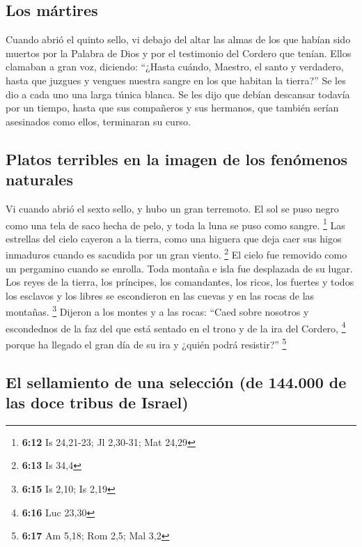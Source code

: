 \hypertarget{los-muxe1rtires}{%
\subsection{Los mártires}\label{los-muxe1rtires}}

 Cuando abrió el quinto sello, vi debajo del altar las
almas de los que habían sido muertos por la Palabra de Dios y por el
testimonio del Cordero que tenían.  Ellos clamaban a gran
voz, diciendo: ``¿Hasta cuándo, Maestro, el santo y verdadero, hasta que
juzgues y vengues nuestra sangre en los que habitan la tierra?''
 Se les dio a cada uno una larga túnica blanca. Se les
dijo que debían descansar todavía por un tiempo, hasta que sus
compañeros y sus hermanos, que también serían asesinados como ellos,
terminaran su curso.

\hypertarget{platos-terribles-en-la-imagen-de-los-fenuxf3menos-naturales}{%
\subsection{Platos terribles en la imagen de los fenómenos
naturales}\label{platos-terribles-en-la-imagen-de-los-fenuxf3menos-naturales}}

 Vi cuando abrió el sexto sello, y hubo un gran
terremoto. El sol se puso negro como una tela de saco hecha de pelo, y
toda la luna se puso como sangre. \footnote{\textbf{6:12} Is 24,21-23;
  Jl 2,30-31; Mat 24,29}  Las estrellas del cielo cayeron
a la tierra, como una higuera que deja caer sus higos inmaduros cuando
es sacudida por un gran viento. \footnote{\textbf{6:13} Is 34,4}
 El cielo fue removido como un pergamino cuando se
enrolla. Toda montaña e isla fue desplazada de su lugar. 
Los reyes de la tierra, los príncipes, los comandantes, los ricos, los
fuertes y todos los esclavos y los libres se escondieron en las cuevas y
en las rocas de las montañas. \footnote{\textbf{6:15} Is 2,10; Is 2,19}
 Dijeron a los montes y a las rocas: ``Caed sobre
nosotros y escondednos de la faz del que está sentado en el trono y de
la ira del Cordero, \footnote{\textbf{6:16} Luc 23,30} 
porque ha llegado el gran día de su ira y ¿quién podrá resistir?''
\footnote{\textbf{6:17} Am 5,18; Rom 2,5; Mal 3,2}

\hypertarget{el-sellamiento-de-una-selecciuxf3n-de-144.000-de-las-doce-tribus-de-israel}{%
\subsection{El sellamiento de una selección (de 144.000 de las doce
tribus de
Israel)}\label{el-sellamiento-de-una-selecciuxf3n-de-144.000-de-las-doce-tribus-de-israel}}


